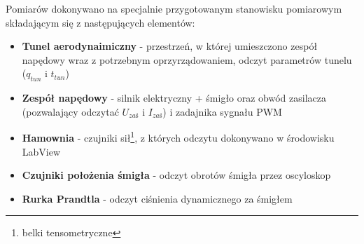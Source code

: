 \akapit Pomiarów dokonywano na specjalnie przygotowanym stanowisku pomiarowym składającym się z następujących elementów:

\begin{itemize}
    \item \textbf{Tunel aerodynaimiczny} - przestrzeń, w której umieszczono zespół napędowy wraz z potrzebnym oprzyrządowaniem, odczyt parametrów tunelu ($q_{tun}$ i $t_{tun}$)
    \item \textbf{Zespół napędowy} - silnik elektryczny + śmigło oraz obwód zasilacza (pozwalający odczytać $U_{zaś}$ i $I_{zaś}$) i zadajnika sygnału PWM
    \item \textbf{Hamownia} - czujniki sił\footnote{belki tensometryczne}, z których odczytu dokonywano w środowisku LabView
    \item \textbf{Czujniki położenia śmigła} - odczyt obrotów śmigła przez oscyloskop
    \item \textbf{Rurka Prandtla} - odczyt ciśnienia dynamicznego za śmigłem
\end{itemize}
